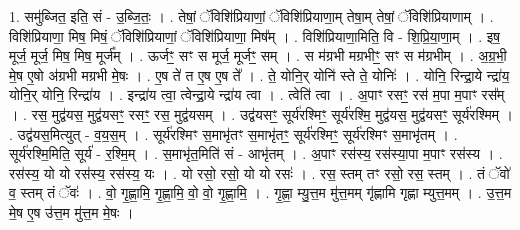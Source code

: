 \documentclass[17pt]{extarticle}
\begin{document}
1. समु॑ब्जित॒ इति॒ सं - उ॒ब्जि॒तः॒ । . तेषां॒ ॅविशि॑प्रियाणां॒ ॅविशि॑प्रियाणा॒म् तेषा॒म् तेषां॒ ॅविशि॑प्रियाणाम् । . विशि॑प्रियाणा॒ मिष॒ मिषं॒ ॅविशि॑प्रियाणां॒ ॅविशि॑प्रियाणा॒ मिष᳚म् । . विशि॑प्रियाणा॒मिति॒ वि - शि॒प्रि॒या॒णा॒म् । . इष॒ मूर्ज॒ मूर्ज॒ मिष॒ मिष॒ मूर्ज᳚म् । . ऊर्जꣳ॒॒ सꣳ स मूर्ज॒ मूर्जꣳ॒॒ सम् । . स म॑ग्रभी मग्रभीꣳ॒॒ सꣳ स म॑ग्रभीम् । . अ॒ग्र॒भी॒ मे॒ष ए॒षो अ॑ग्रभी मग्रभी मे॒षः । . ए॒ष ते॑ त ए॒ष ए॒ष ते᳚ । . ते॒ योनि॒र् योनि॑ स्ते ते॒ योनिः॑ । . योनि॒ रिन्द्रा॒ये न्द्रा॑य॒ योनि॒र् योनि॒ रिन्द्रा॑य । . इन्द्रा॑य त्वा॒ त्वेन्द्रा॒ये न्द्रा॑य त्वा । . त्वेति॑ त्वा । . अ॒पाꣳ रसꣳ॒॒ रस॑ म॒पा म॒पाꣳ रस᳚म् । . रस॒ मुद्व॑यस॒ मुद्व॑यसꣳ॒॒ रसꣳ॒॒ रस॒ मुद्व॑यसम् । . उद्व॑यसꣳ॒॒ सूर्य॑रश्मिꣳ॒॒ सूर्य॑रश्मि॒ मुद्व॑यस॒ मुद्व॑यसꣳ॒॒ सूर्य॑रश्मिम् । . उद्व॑यस॒मित्युत् - व॒य॒स॒म् । . सूर्य॑रश्मिꣳ स॒माभृ॑तꣳ स॒माभृ॑तꣳ॒॒ सूर्य॑रश्मिꣳ॒॒ सूर्य॑रश्मिꣳ स॒माभृ॑तम् । . सूर्य॑रश्मि॒मिति॒ सूर्य॑ - र॒श्मि॒म् । . स॒माभृ॑त॒मिति॑ सं - आभृ॑तम् । . अ॒पाꣳ रस॑स्य॒ रस॑स्या॒पा म॒पाꣳ रस॑स्य । . रस॑स्य॒ यो यो रस॑स्य॒ रस॑स्य॒ यः । . यो रसो॒ रसो॒ यो यो रसः॑ । . रस॒ स्तम् तꣳ रसो॒ रस॒ स्तम् । . तं ॅवो॑ व॒ स्तम् तं ॅवः॑ । . वो॒ गृ॒ह्णा॒मि॒ गृ॒ह्णा॒मि॒ वो॒ वो॒ गृ॒ह्णा॒मि॒ । . गृ॒ह्णा॒ म्यु॒त्त॒म मु॑त्त॒मम् गृ॑ह्णामि गृह्णा म्युत्त॒मम् । . उ॒त्त॒म मे॒ष ए॒ष उ॑त्त॒म मु॑त्त॒म मे॒षः । \newline
\end{document}
